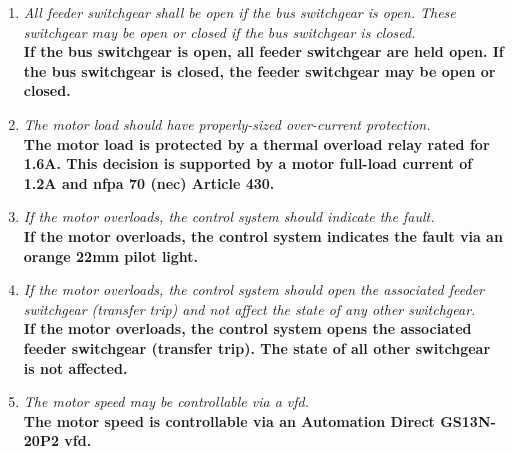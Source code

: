 \begin{enumerate}
  \item \emph{ All feeder switchgear shall be open if the bus
      switchgear is open. These switchgear may be open or closed if the
    bus switchgear is closed.}\\
    \textbf{If the bus switchgear is open, all feeder switchgear are
      held open. If the bus switchgear
    is closed, the feeder switchgear may be open or closed.}

  \item \emph{ The motor load should have properly-sized over-current
    protection.}\\
    \textbf{The motor load is protected by a thermal overload relay rated for 1.6A.
      This decision is supported by a motor full-load current of 1.2A and \gls{nfpa} 70 (\gls{nec}) Article 430.}

  \item \emph{ If the motor overloads, the control system should
    indicate the fault.}\\
    \textbf{If the motor overloads, the control system indicates the
      fault via an orange 22mm pilot light.}

  \item \emph{ If the motor overloads, the control system should open
      the associated feeder switchgear (transfer trip) and not affect
    the state of any other switchgear.}\\
    \textbf{If the motor overloads, the control system opens the
      associated feeder switchgear
    (transfer trip). The state of all other switchgear is not affected.}

  \item \emph{ The motor speed may be controllable via a
    \gls{vfd}.}\\
    \textbf{The motor speed is controllable via an Automation Direct GS13N-20P2
      \gls{vfd}.}
\end{enumerate}
